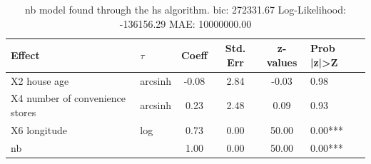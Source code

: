 \begin{table}
	\caption{nb model found through the hs algorithm. bic: 272331.67 Log-Likelihood: -136156.29 MAE: 10000000.00}
	\begin{center}
		\begin{tabular}{|l|l|c|c|c|l|}
			\hline
			Effect & $\tau$ & Coeff & Std. Err & z-values & Prob |z|>Z \\
			\hline
			X2 house age & arcsinh & -0.08 & 2.84 & -0.03 & 0.98 \\
			\hline
			X4 number of convenience stores & arcsinh & 0.23 & 2.48 & 0.09 & 0.93 \\
			\hline
			X6 longitude & log & 0.73 & 0.00 & 50.00 & 0.00*** \\
			\hline
			nb &  & 1.00 & 0.00 & 50.00 & 0.00*** \\
			\hline
		\end{tabular}
	\end{center}
\end{table}